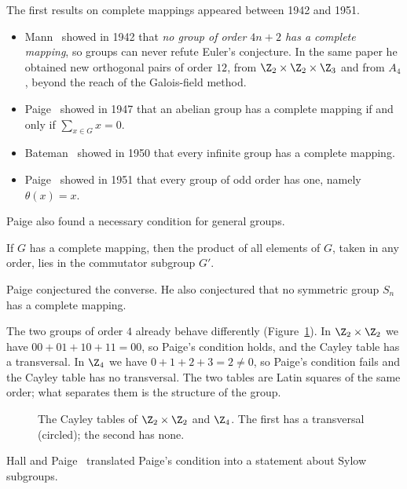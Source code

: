 
The first results on complete mappings appeared between 1942 and 1951.
\begin{itemize}
\item Mann~\cite{man42} showed in 1942 that \emph{no group of order $4n+2$ has a complete mapping}, so groups can never refute Euler's conjecture. In the same paper he obtained new orthogonal pairs of order $12$, from $\Z_2\times\Z_2\times\Z_3$ and from $A_4$, beyond the reach of the Galois-field method.
\item Paige~\cite{pai47} showed in 1947 that an abelian group has a complete mapping if and only if $\sum_{x\in G}x=0$.
\item Bateman~\cite{bat50} showed in 1950 that every infinite group has a complete mapping.
\item Paige~\cite{pai51} showed in 1951 that every group of odd order has one, namely $\theta(x)=x$.
\end{itemize}
Paige also found a necessary condition for general groups.

\begin{theorem}\label{thm:paige}
If $G$ has a complete mapping, then the product of all elements of $G$, taken in any order, lies in the commutator subgroup $G'$.
\end{theorem}

Paige conjectured the converse. He also conjectured that no symmetric group $S_n$ has a complete mapping.

\begin{example}\label{ex:order-four}
The two groups of order $4$ already behave differently (Figure~\ref{fig:z2z2-z4}). In $\Z_2\times\Z_2$ we have $00+01+10+11=00$, so Paige's condition holds, and the Cayley table has a transversal. In $\Z_4$ we have $0+1+2+3=2\neq0$, so Paige's condition fails and the Cayley table has no transversal. The two tables are Latin squares of the same order; what separates them is the structure of the group.
\end{example}

\begin{figure}[ht]
\centering

\caption{The Cayley tables of $\Z_2\times\Z_2$ and $\Z_4$. The first has a transversal (circled); the second has none.}
\label{fig:z2z2-z4}
\end{figure}


Hall and Paige~\cite{hp55} translated Paige's condition into a statement about Sylow subgroups.


